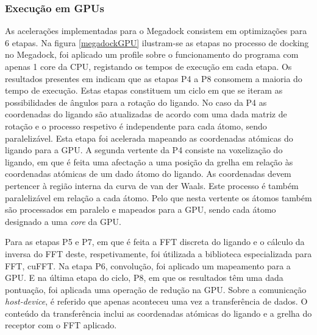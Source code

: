  \subsubsection{Execução em GPUs}
As acelerações implementadas para o Megadock consistem em optimizações para 6 etapas. Na figura \ref{megadockGPU} ilustram-se as etapas no processo de docking no Megadock, foi aplicado um profile sobre o funcionamento do programa com apenas 1 core da CPU, registando os tempos de execução em cada etapa. Os resultados presentes em \cite{shimoda2015protein} indicam que as etapas P4 a P8 consomem a maioria do tempo de execução. Estas etapas constituem um ciclo em que se iteram as possibilidades de ângulos para a rotação do ligando. No caso da P4 as coordenadas do ligando são atualizadas de acordo com uma dada matriz de rotação e o processo respetivo é independente para cada átomo, sendo paralelizável. Esta etapa foi acelerada mapeando as coordenadas atómicas do ligando para a GPU. 
A segunda vertente da P4 consiste na voxelização do ligando, em que é feita uma afectação a uma posição da grelha em relação às coordenadas atómicas de um dado átomo do ligando. As coordenadas devem pertencer à região interna da curva de van der Waals. Este processo é também paralelizável em relação a cada átomo. Pelo que nesta vertente os átomos também são processados em paralelo e mapeados para a GPU, sendo cada átomo designado a uma \textit{core} da GPU.\par Para as etapas P5 e P7, em que é feita a FFT discreta do ligando e o cálculo da inversa do FFT deste, respetivamente, foi útilizada a biblioteca especializada para FFT, cuFFT. Na etapa P6, convolução, foi aplicado um mapeamento para a GPU. E na última etapa do ciclo, P8, em que os resultados têm uma dada pontuação, foi aplicada uma operação de redução na GPU. 
Sobre a comunicação \textit{host-device}, é referido que apenas aconteceu uma vez a transferência de dados. O conteúdo da transferência inclui as coordenadas atómicas do ligando e a grelha do receptor com o FFT aplicado. \par
